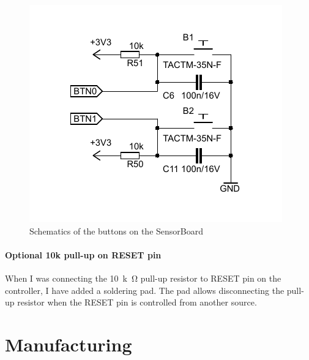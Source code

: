 \begin{figure}
    \centering
    \label{fig:schButton}
    \caption{Schematics of the buttons on the SensorBoard}
    \includegraphics[scale=1.3]{img/SchButtons.pdf}
\end{figure}

\paragraph{Optional 10k pull-up on RESET pin}
When I was connecting the \SI{10}{k\ohm} pull-up resistor to RESET pin on the controller, I have added a soldering pad. The pad allows disconnecting the pull-up resistor when the RESET pin is controlled from another source.

\section{Manufacturing}
\label{HWmanufacturing}

